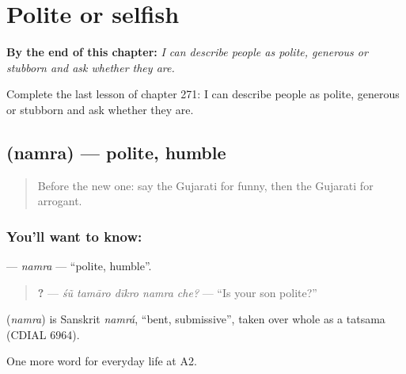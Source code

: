 
\chapter{Polite or selfish}
\label{ch:gu-polite-or-selfish}

\begin{chapteropening}
\textbf{By the end of this chapter:} \emph{I can describe people as polite, generous or stubborn and ask whether they are.}

Complete the last lesson of chapter 271: I can describe people as polite, generous or stubborn and ask whether they are.
\end{chapteropening}

\section[\texorpdfstring{\gu{નમ્ર} (namra)}{નમ્ર (namra)}]{ (namra) — polite, humble}

\label{lesson:GU-C271-namra}



\begin{quote}
Before the new one: say the Gujarati for funny, then the Gujarati for arrogant.
\end{quote}

\subsection*{You'll want to know: }
\textbf{} — \emph{namra} — \textquotedblleft{}polite, humble\textquotedblright{}.

\begin{quote}
\textbf{    ?} — \emph{śũ tamāro dīkro namra che?} — \textquotedblleft{}Is your son polite?\textquotedblright{}
\end{quote}

\begin{cousinweb}
\textbf{} (\emph{namra}) is Sanskrit \emph{namrá}, \textquotedblleft{}bent, submissive\textquotedblright{}, taken over whole as a tatsama (CDIAL 6964).
\end{cousinweb}

\begin{grammarlens}[title={What you've built}]
One more word for everyday life at A2.
\end{grammarlens}

